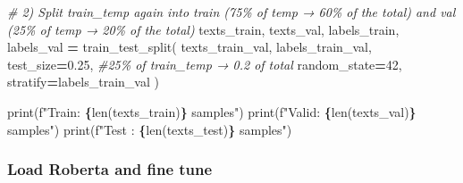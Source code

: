 \documentclass[
]{article}
\newenvironment{Shaded}{\begin{snugshade}}{\end{snugshade}}
\newcommand{\BuiltInTok}[1]{#1}
\newcommand{\CommentTok}[1]{\textcolor[rgb]{0.56,0.35,0.01}{\textit{#1}}}
\newcommand{\DecValTok}[1]{\textcolor[rgb]{0.00,0.00,0.81}{#1}}
\newcommand{\FloatTok}[1]{\textcolor[rgb]{0.00,0.00,0.81}{#1}}
\newcommand{\NormalTok}[1]{#1}
\newcommand{\OperatorTok}[1]{\textcolor[rgb]{0.81,0.36,0.00}{\textbf{#1}}}
\newcommand{\SpecialCharTok}[1]{\textcolor[rgb]{0.81,0.36,0.00}{\textbf{#1}}}
\newcommand{\SpecialStringTok}[1]{\textcolor[rgb]{0.31,0.60,0.02}{#1}}
\begin{document}
\begin{Shaded}
\begin{Highlighting}[]
\CommentTok{\# 2) Split train\_temp again into train (75\% of temp → 60\% of the total) and val (25\% of temp → 20\% of the total)}
\NormalTok{texts\_train, texts\_val, labels\_train, labels\_val }\OperatorTok{=}\NormalTok{ train\_test\_split(}
\NormalTok{    texts\_train\_val,}
\NormalTok{    labels\_train\_val,}
\NormalTok{    test\_size}\OperatorTok{=}\FloatTok{0.25}\NormalTok{,      }\CommentTok{\#25\% of train\_temp → 0.2 of total}
\NormalTok{    random\_state}\OperatorTok{=}\DecValTok{42}\NormalTok{,}
\NormalTok{    stratify}\OperatorTok{=}\NormalTok{labels\_train\_val}
\NormalTok{)}

\BuiltInTok{print}\NormalTok{(}\SpecialStringTok{f"Train: }\SpecialCharTok{\{}\BuiltInTok{len}\NormalTok{(texts\_train)}\SpecialCharTok{\}}\SpecialStringTok{ samples"}\NormalTok{)}
\BuiltInTok{print}\NormalTok{(}\SpecialStringTok{f"Valid: }\SpecialCharTok{\{}\BuiltInTok{len}\NormalTok{(texts\_val)}\SpecialCharTok{\}}\SpecialStringTok{ samples"}\NormalTok{)}
\BuiltInTok{print}\NormalTok{(}\SpecialStringTok{f"Test : }\SpecialCharTok{\{}\BuiltInTok{len}\NormalTok{(texts\_test)}\SpecialCharTok{\}}\SpecialStringTok{ samples"}\NormalTok{)}
\end{Highlighting}
\end{Shaded}

\subsubsection{Load Roberta and fine
tune}\label{load-roberta-and-fine-tune}
\end{document}
